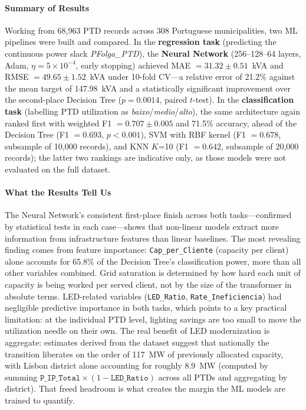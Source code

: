 \documentclass[conference]{IEEEtran}
\begin{document}
\paragraph{Summary of Results}
Working from 68,963 PTD records across 308 Portuguese municipalities, two ML pipelines were built and compared. In the \textbf{regression task} (predicting the continuous power slack \textit{PFolga\_PTD}), the \textbf{Neural Network} (256--128--64 layers, Adam, $\eta = 5{\times}10^{-4}$, early stopping) achieved MAE $= 31.32 \pm 0.51$~kVA and RMSE $= 49.65 \pm 1.52$~kVA under 10-fold CV---a relative error of 21.2\% against the mean target of 147.98~kVA and a statistically significant improvement over the second-place Decision Tree ($p = 0.0014$, paired $t$-test). In the \textbf{classification task} (labelling PTD utilization as \textit{baixo}/\textit{medio}/\textit{alto}), the same architecture again ranked first with weighted F1 $= 0.707 \pm 0.005$ and 71.5\% accuracy, ahead of the Decision Tree (F1 $= 0.693$, $p < 0.001$), SVM with RBF kernel (F1 $= 0.678$, subsample of 10,000 records), and KNN $K$=10 (F1 $= 0.642$, subsample of 20,000 records); the latter two rankings are indicative only, as those models were not evaluated on the full dataset.

\paragraph{What the Results Tell Us}
The Neural Network's consistent first-place finish across both tasks---confirmed by statistical tests in each case---shows that non-linear models extract more information from infrastructure features than linear baselines. The most revealing finding comes from feature importance: \texttt{Cap\_per\_Cliente} (capacity per client) alone accounts for 65.8\% of the Decision Tree's classification power, more than all other variables combined. Grid saturation is determined by how hard each unit of capacity is being worked per served client, not by the size of the transformer in absolute terms. LED-related variables (\texttt{LED\_Ratio}, \texttt{Rate\_Ineficiencia}) had negligible predictive importance in both tasks, which points to a key practical limitation: at the individual PTD level, lighting savings are too small to move the utilization needle on their own. The real benefit of LED modernization is aggregate: estimates derived from the dataset suggest that nationally the transition liberates on the order of 117~MW of previously allocated capacity, with Lisbon district alone accounting for roughly 8.9~MW (computed by summing $\texttt{P\_IP\_Total} \times (1 - \texttt{LED\_Ratio})$ across all PTDs and aggregating by district). That freed headroom is what creates the margin the ML models are trained to quantify.
\end{document}
